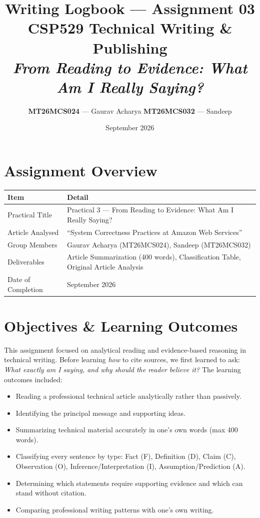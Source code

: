 \documentclass[11pt, a4paper]{article}
\title{
    \vspace{-1cm}
    \textbf{Writing Logbook --- Assignment 03} \\[0.3em]
    \large CSP529 Technical Writing \& Publishing \\[0.2em]
    \large \textit{From Reading to Evidence: What Am I Really Saying?}
}
\author{
    \textbf{MT26MCS024} --- Gaurav Acharya \quad
    \textbf{MT26MCS032} --- Sandeep
}
\date{September 2026}
\begin{document}
\maketitle
\thispagestyle{fancy}

\section{Assignment Overview}

\begin{tabular}{@{}p{4.5cm} p{10cm}@{}}
    \toprule
    \textbf{Item} & \textbf{Detail} \\
    \midrule
    Practical Title & Practical 3 --- From Reading to Evidence: What Am I Really Saying? \\
    Article Analysed & ``System Correctness Practices at Amazon Web Services'' \\
    Group Members & Gaurav Acharya (MT26MCS024), Sandeep (MT26MCS032) \\
    Deliverables & Article Summarization (400 words), Classification Table, Original Article Analysis \\
    Date of Completion & September 2026 \\
    \bottomrule
\end{tabular}

\section{Objectives \& Learning Outcomes}

This assignment focused on analytical reading and evidence-based reasoning in technical writing. Before learning \emph{how} to cite sources, we first learned to ask: \emph{What exactly am I saying, and why should the reader believe it?} The learning outcomes included:

\begin{itemize}[nosep]
    \item Reading a professional technical article analytically rather than passively.
    \item Identifying the principal message and supporting ideas.
    \item Summarizing technical material accurately in one's own words (max 400 words).
    \item Classifying every sentence by type: Fact (F), Definition (D), Claim (C), Observation (O), Inference/Interpretation (I), Assumption/Prediction (A).
    \item Determining which statements require supporting evidence and which can stand without citation.
    \item Comparing professional writing patterns with one's own writing.
\end{itemize}
\end{document}
